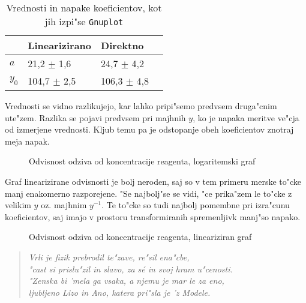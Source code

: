 \documentclass[a4paper,10pt]{article}
\begin{document}
\begin{table}
\begin{center}
  \begin{tabular}{|l|l|l|l|}
  \hline
  & Linearizirano & Direktno \\
  \hline
  $a$ & 21,2 $\pm$ 1,6 & 24,7 $\pm$ 4,2\\
  $y_0$ & 104,7 $\pm$ 2,5 & 106,3 $\pm$ 4,8\\
  \hline
\end{tabular}
\end{center}
 \label{tab:primerjava}
\caption{Vrednosti in napake koeficientov, kot jih izpi"se \texttt{Gnuplot}}
\end{table}

Vrednosti se vidno razlikujejo, kar lahko pripi"semo predvsem druga"cnim ute"zem. Razlika se pojavi predvsem pri majhnih $y$, ko je napaka meritve ve"cja od izmerjene vrednosti. Kljub temu pa je odstopanje obeh koeficientov znotraj meja napak. 


\begin{figure}
 
  \caption{Odvisnost odziva od koncentracije reagenta, logaritemski graf}
  \label{fig:receptorji-log}
\end{figure}

Graf linearizirane odvisnosti je bolj neroden, saj so v tem primeru merske to"cke manj enakomerno razporejene. "Se najbolj"se se vidi, "ce prika"zem le to"cke z velikim $y$ oz. majhnim $y^{-1}$. Te to"cke so tudi najbolj pomembne pri izra"cunu koeficientov, saj imajo v prostoru transformiranih spremenljivk manj"so napako. 

\begin{figure}
 
  \caption{Odvisnost odziva od koncentracije reagenta, lineariziran graf}
  \label{fig:receptorji-lin}
\end{figure}

\newpage

\begin{verse}
  \textit{Vrli je fizik prebrodil te"zave, re"sil ena"cbe, \\
  "cast si prislu"zil in slavo, za s\'e in svoj hram u"cenosti. \\
  "Zenska bi 'mela ga vsaka, a njemu je mar le za eno, \\
  ljubljeno Lizo in Ano, katera pri"sla je 'z Modele. }
\end{verse}
\end{document}
